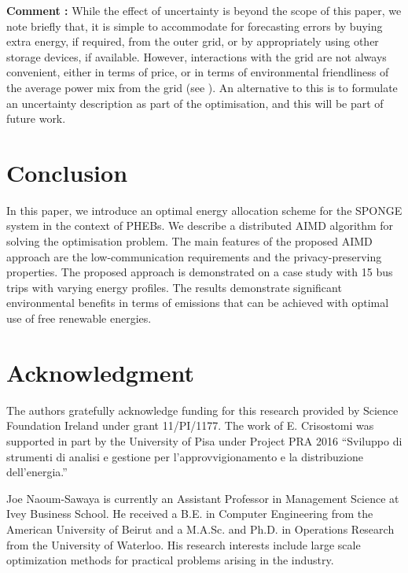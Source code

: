 \documentclass[journal]{IEEEtran}
\begin{document}
{\bf Comment :}  While the effect of uncertainty is beyond the scope of this paper, we note briefly that, it is simple to accommodate for forecasting errors by buying extra energy, if required, from the outer grid, or by appropriately using other storage devices, if available. However, interactions with the grid are not always convenient, either in terms of price, or in terms of environmental friendliness of the average power mix from the grid (see \cite{TITS_V2G}). An alternative to this is to formulate an uncertainty
description as part of the optimisation, and this will be part of future work.   


\section{Conclusion}  \label{Conclusion}



In this paper, we introduce an optimal energy allocation scheme for the SPONGE system in the context of PHEBs. We describe a distributed AIMD algorithm for solving the optimisation problem. The main features of the proposed AIMD approach are the low-communication requirements and the privacy-preserving properties. The proposed approach is demonstrated on a case study with 15 bus trips with varying energy profiles. The results demonstrate significant environmental benefits in terms of  emissions that can be achieved with optimal use of free renewable energies.    


\section*{Acknowledgment}


The authors gratefully acknowledge funding for this research provided by Science Foundation Ireland under grant 11/PI/1177.  The work of E. Crisostomi was supported in part by the University of Pisa under Project PRA 2016 “Sviluppo di strumenti di analisi e gestione per l’approvvigionamento e la distribuzione dell’energia.”


\ifCLASSOPTIONcaptionsoff
  \newpage
\fi














\begin{IEEEbiography}{Joe Naoum-Sawaya}
is currently an Assistant Professor in Management Science at Ivey Business School. He received a B.E. in Computer Engineering from the American University of Beirut and a M.A.Sc. and Ph.D. in Operations Research from the University of Waterloo. His research interests include large scale optimization methods for practical problems arising in the industry. 
\end{IEEEbiography}
\end{document}
